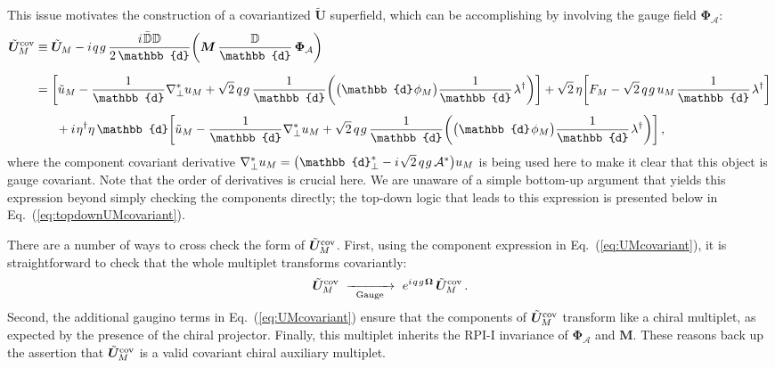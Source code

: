 \documentclass[12pt,document,nofootinbib,superscriptaddress,onecolumn,preprintnumbers,balancelastpage]{article}
\newcommand{\s}{\hspace{0.8pt}}
\newcommand{\PP}{\mathbb{d}}
\newcommand{\gauge}{\,\,\xrightarrow[\hspace{5pt}\text{Gauge}\hspace{5pt}]{}\,\,}
\DeclareRobustCommand{\Eq}[1]{Eq.~(\ref{#1})}
\newcommand{\bM}{ \boldsymbol M}
\newcommand{\bPhiA}{ \boldsymbol{\Phi}_\alc}
\newcommand{\bU}{ \tilde{\boldsymbol U}}
\newcommand{\D}{\mathbb{D}}
\newcommand{\RCA}{\boldsymbol{\Omega}}
\newcommand{\alc}{\mathcal{A}}
\newcommand{\uu}{\tilde u}
\begin{document}
\begin{spacing}{1.2}
This issue motivates the construction of a covariantized $\bU$ superfield, which can be accomplishing by involving the gauge field $\bPhiA$:  
%
\begin{align}
\bU_M^{\rm cov} &\equiv \bU_M - i\s q\s g\, \frac{i\s \bar{\D} \D}{2\, \PP} \bigg(\bM\, \frac{\D}{\PP}\, \bPhiA  \bigg)\notag \\[6pt]
& =  \bigg[ \uu_M - \frac{1}{\PP}\nabla_\perp^* u_M  + \sqrt{2}\, q\s g\, \frac{1}{\PP}  \bigg( \big( \PP\s \phi_M \big) \frac{1}{\PP}\s \lambda^\dagger  \bigg)  \bigg] +\sqrt{2}\, \eta \bigg[ F_M -  \sqrt{2}\,q\s g\, u_M\s \frac{1}{\PP}\s \lambda^\dagger \bigg] \notag \\[4pt]
& \hspace{17pt}+ i\s \eta^\dagger \eta\, \PP \bigg[ \uu_M - \frac{1}{\PP} \nabla_\perp^* u_M  + \sqrt{2}\, q\s g \, \frac{1}{\PP} \bigg( \big( \PP\s \phi_M \big) \frac{1}{\PP}\s \lambda^\dagger   \bigg)  \bigg] \,,
 \label{eq:UMcovariant}
\end{align}
%
where the component covariant derivative $\nabla_\perp^* u_M = \big( \PP_\perp^* - i\s \sqrt{2}\,q\s g\, \alc^* \big) u_M$ is being used here to make it clear that this object is gauge covariant.
%
Note that the order of derivatives is crucial here.  
%
We are unaware of a simple bottom-up argument that yields this expression beyond simply checking the components directly; the top-down logic that leads to this expression is presented below in \Eq{eq:topdownUMcovariant}.


There are a number of ways to cross check the form of $\bU_M^{\rm cov}$.
%
First, using the component expression in \Eq{eq:UMcovariant}, it is straightforward to check that the whole multiplet transforms covariantly:
%
\begin{equation}
\bU_M^{\rm cov}  \gauge e^{i\s q\s g\s \RCA}\, \bU_M^{\rm cov}\,.
\end{equation}
%
Second, the additional gaugino terms in \Eq{eq:UMcovariant} ensure that the components of $\bU_M^{\rm cov}$ transform like a chiral multiplet, as expected by the presence of the chiral projector.
%
Finally, this multiplet inherits the RPI-I invariance of $\bPhiA$ and $\bM$.
%
These reasons back up the assertion that $\bU_M^{\rm cov}$ is a valid covariant chiral auxiliary multiplet.



\end{spacing}
\end{document}
